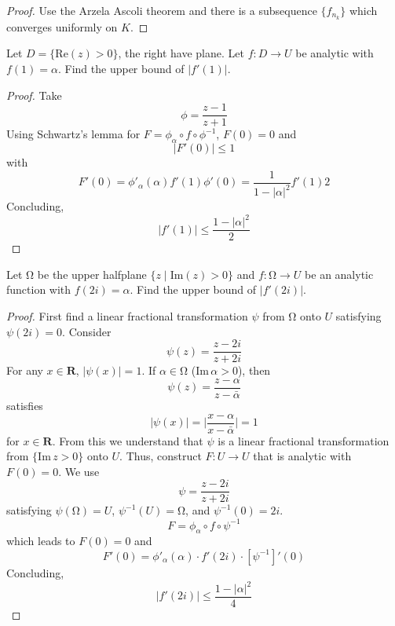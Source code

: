 \vspace{2ex}
\begin{proof}
Use the Arzela Ascoli theorem and there is a subsequence $\{f_{n_{k}}\}$ which converges uniformly on $K$. 
\end{proof}
\vspace{2ex}
\begin{ex}
Let $D=\{\mathrm{Re}(z)>0\}$, the right have plane. Let $f:D\rightarrow U$ be analytic with $f(1)=\alpha $. Find the upper bound of $|f'(1)|$. 
\end{ex}
\vspace{2ex}
\begin{proof}
Take 
\[\phi =\dfrac{z-1}{z+1}\]
Using Schwartz's lemma for $F=\phi _{\alpha }\circ f \circ \phi^{-1} $, $F(0)=0$ and 
\[|F'(0)|\leq 1\]
with
\[F'(0)=\phi '_{\alpha }(\alpha )f'(1)\phi '(0)=\dfrac{1}{1-|\alpha |^2}f'(1)2\]
Concluding,
\[|f'(1)|\leq \dfrac{1-|\alpha |^2}{2}\]
\end{proof}
\vspace{2ex}
\begin{ex}
Let $\mathrm{\Omega} $ be the upper halfplane $\{z\;|\; \mathrm{Im}(z)>0\}$ and $f:\mathrm{\Omega} \rightarrow U$ be an analytic function with $f(2i)=\alpha $. Find the upper bound of $|f'(2i)|$. 
\end{ex}
\vspace{2ex}
\begin{proof}
First find a linear fractional transformation $\psi$ from $\mathrm{\Omega} $ onto $U$ satisfying $\psi (2i)=0$. Consider 
\[\psi (z)=\dfrac{z-2i}{z+2i}\]
For any $x\in {\bm R}$, $|\psi (x)|=1$. If $\alpha \in \mathrm{\Omega} $ ($\mathrm{Im}\,\alpha >0$), then
\[\psi (z)=\dfrac{z-\alpha }{z-\bar{\alpha }}\]
satisfies 
\[|\psi (x)|=\Big|\dfrac{x-\alpha }{x-\bar{\alpha }}\Big|=1\]
for $x\in {\bm R}$. From this we understand that $\psi $ is a linear fractional transformation from $\{\mathrm{Im}\,z>0\}$ onto $U$. Thus, construct $F:U\rightarrow U$ that is analytic with $F(0)=0$. We use 
\[\psi =\dfrac{z-2i}{z+2i}\]
satisfying $\psi (\mathrm{\Omega} )=U$, $\psi ^{-1}(U)=\mathrm{\Omega} $, and $\psi ^{-1}(0)=2i$. 
\[F=\phi _{\alpha }\circ f\circ \psi ^{-1}\]
which leads to $F(0)=0$ and 
\[F'(0)=\phi '_{\alpha }(\alpha )\cdot f'(2i)\cdot [\psi ^{-1}]'(0)\]
Concluding,
\[|f'(2i)|\leq \dfrac{1-|\alpha |^2}{4}\]
\end{proof}
\vspace{2ex}

